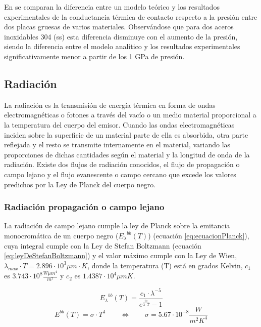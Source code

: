 En \cite{experimental_Rc_SS} se comparan la diferencia entre un modelo teórico y los resultados experimentales de la conductancia térmica de contacto respecto a la presión entre dos placas gruesas de varios materiales. Observándose que para dos aceros inoxidables 304 (\acrshort{ss}) esta diferencia disminuye con el aumento de la presión, siendo la diferencia entre el modelo analítico y los resultados experimentales significativamente menor a partir de los 1 GPa de presión.

\subsection{Radiación}
La radiación es la transmisión de energía térmica en forma de ondas electromagnéticas o fotones a través del vacío o un medio material proporcional a la temperatura del cuerpo del emisor. Cuando las ondas electromagnéticas inciden sobre la superficie de un material parte de ella es absorbida, otra parte reflejada y el resto se transmite internamente en el material, variando las proporciones de dichas cantidades según el material y la longitud de onda de la radiación. Existe dos flujos de radiación conocidos, el flujo de propagación o campo lejano y el flujo evanescente o campo cercano que excede los valores predichos por la Ley de Planck del cuerpo negro.\\

\subsubsection{Radiación propagación o campo lejano}
La radiación de campo lejano cumple la ley de Planck sobre la emitancia monocromática de un cuerpo negro (${E_{\lambda}}^{bb}(T)$) (ecuación \ref{eq:ecuacionPlanck}), cuya integral cumple con la Ley de Stefan Boltzmann (ecuación \ref{eq:leyDeStefanBoltzmann}) y el valor máximo cumple con la Ley de Wien, $\lambda_{max}\cdot T=2.896\cdot 10^3 \mu m\cdot K$, donde la temperatura (T) está en grados Kelvin, $c_1$ es $3.743\cdot 10^8 \frac{W\mu m^4}{m^2}$ y $c_2$ es $1.4387\cdot 10^4 \mu mK$.

\begin{equation}
{E_\lambda}^{bb}\left( T \right) = \dfrac{c_1\cdot \lambda^{-5}}{e^{\frac{c_2}{\lambda \cdot T}}-1}
\label{eq:ecuacionPlanck}
\end{equation}
\begin{equation}
{E}^{bb}\left( T \right)=\sigma \cdot T^4 \qquad \Longleftrightarrow \qquad \sigma = 5.67\cdot 10^{-8} \dfrac{W}{m^2 K^4}
\label{eq:leyDeStefanBoltzmann}
\end{equation}

